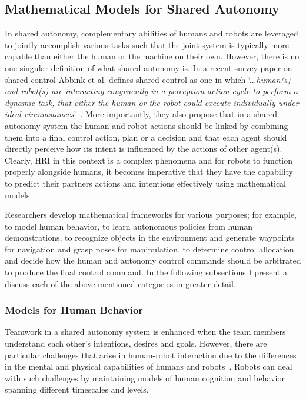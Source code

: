 \documentclass[12pt]{article}
\begin{document}
\subsection{Mathematical Models for Shared Autonomy}
In shared autonomy, complementary abilities of humans and robots are leveraged to jointly accomplish various tasks such that the joint system is typically more capable than either the human or the machine on their own. However, there is no one singular definition of what shared autonomy is. In a recent survey paper on shared control Abbink et al. defines shared control as one in which `...\textit{human(s) and robot(s) are interacting congruently in a perception-action cycle to perform a dynamic task, that either the human or the robot could execute individually under ideal circumstances}'~\cite{abbink2018topology}. More importantly, they also propose that in a shared autonomy system the human and robot actions should be linked by combining them into a final control action, plan or a decision and that each agent should directly perceive how its intent is influenced by the actions of other agent(s). Clearly, HRI in this context is a complex phenomena and for robots to function properly alongside humans, it becomes imperative that they have the capability to predict their partners actions and intentions effectively using mathematical models. 

Researchers develop mathematical frameworks for various purposes; for example, to model human behavior, to learn autonomous policies from human demonstrations, to recognize objects in the environment and generate waypoints for navigation and grasp poses for manipulation, to determine control allocation and decide how the human and autonomy control commands should be arbitrated to produce the final control command. In the following subsections I present a discuss each of the above-mentioned categories in greater detail.  

\subsubsection{Models for Human Behavior}
Teamwork in a shared autonomy system is enhanced when the team members understand each other's intentions, desires and goals. However, there are particular challenges that arise in human-robot interaction due to the differences in the mental and physical capabilities of humans and robots~\cite{hiatt2017human}. Robots can deal with such challenges by maintaining models of human cognition and behavior~\cite{javdani2015shared} spanning different timescales and levels. 
\end{document}

